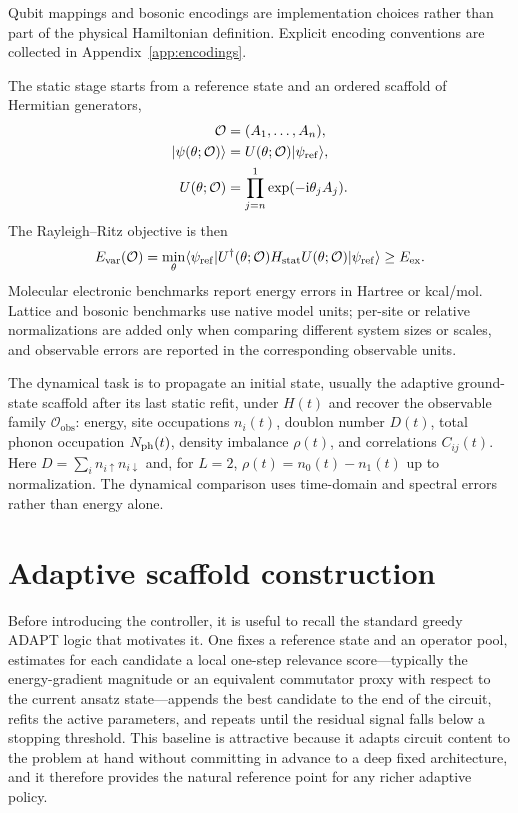 \documentclass[
  reprint,
  amsmath,
  amssymb,
  aps,
  pra,
  nofootinbib,
  superscriptaddress,
  floatfix
]{revtex4-2}
\newcommand{\Oset}{\mathcal{O}}
\newcommand{\Ocal}{\mathcal{O}}
\newcommand{\ii}{\mathrm{i}}
\newcommand{\ex}{\mathrm{ex}}
\newcommand{\stat}{\mathrm{stat}}
\newcommand{\obs}{\mathrm{obs}}
\newcommand{\ket}[1]{|#1\rangle}
\newcommand{\bra}[1]{\langle #1|}
\begin{document}
Qubit mappings and bosonic encodings are implementation choices rather than part of the physical Hamiltonian definition. Explicit encoding conventions are collected in Appendix~\ref{app:encodings}.

The static stage starts from a reference state and an ordered scaffold of Hermitian generators,
\begin{equation}
\begin{aligned}
\Oset&=(A_1,\ldots,A_n),\\
\ket{\psi(\theta;\Oset)}&=U(\theta;\Oset)\ket{\psi_{\rm ref}},\\
U(\theta;\Oset)&=\prod_{j=n}^{1}\exp(-\ii\theta_jA_j).
\end{aligned}
\label{eq:ansatz_state}
\end{equation}
The Rayleigh--Ritz objective is then
\begin{equation}
E_{\rm var}(\Oset)=
\min_{\theta}
\bra{\psi_{\rm ref}}U^{\dagger}(\theta;\Oset)H_{\stat}U(\theta;\Oset)\ket{\psi_{\rm ref}}
\ge E_{\ex}.
\label{eq:static_task}
\end{equation}
Molecular electronic benchmarks report energy errors in Hartree or kcal/mol. Lattice and bosonic benchmarks use native model units; per-site or relative normalizations are added only when comparing different system sizes or scales, and observable errors are reported in the corresponding observable units.

The dynamical task is to propagate an initial state, usually the adaptive ground-state scaffold after its last static refit, under $H(t)$ and recover the observable family $\Ocal_{\obs}$: energy, site occupations $n_i(t)$, doublon number $D(t)$, total phonon occupation $N_{\rm ph}(t)$, density imbalance $\rho(t)$, and correlations $C_{ij}(t)$. Here $D=\sum_i n_{i\uparrow}n_{i\downarrow}$ and, for $L=2$, $\rho(t)=n_0(t)-n_1(t)$ up to normalization. The dynamical comparison uses time-domain and spectral errors rather than energy alone.

\section{Adaptive scaffold construction}
\label{sec:static_method}

Before introducing the controller, it is useful to recall the standard greedy ADAPT logic that motivates it. One fixes a reference state and an operator pool, estimates for each candidate a local one-step relevance score---typically the energy-gradient magnitude or an equivalent commutator proxy with respect to the current ansatz state---appends the best candidate to the end of the circuit, refits the active parameters, and repeats until the residual signal falls below a stopping threshold. This baseline is attractive because it adapts circuit content to the problem at hand without committing in advance to a deep fixed architecture, and it therefore provides the natural reference point for any richer adaptive policy.
\end{document}
